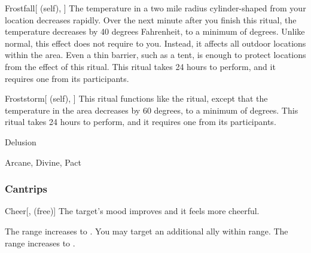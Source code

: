 \lowercase{\hypertarget{spell:Frostfall}{}}\label{spell:Frostfall}
\begin{attuneability}[Rank 4]{\hypertarget{spell:Frostfall}{Frostfall}}[ (self), ]
\targetrule
The temperature in a two mile radius cylinder-shaped  from your location decreases rapidly.
Over the next minute after you finish this ritual, the temperature decreases by 40 degrees Fahrenheit, to a minimum of  degrees.
Unlike normal, this effect does not require  to you.
Instead, it affects all outdoor locations within the area.
Even a thin barrier, such as a tent, is enough to protect locations from the effect of this ritual.
This ritual takes 24 hours to perform, and it requires one  from its participants.
\end{attuneability}
\vspace{0.25em}



\lowercase{\hypertarget{spell:Froststorm}{}}\label{spell:Froststorm}
\begin{attuneability}[Rank 8]{\hypertarget{spell:Froststorm}{Froststorm}}[ (self), ]
\targetrule
This ritual functions like the  ritual, except that the temperature in the area decreases by 60 degrees, to a minimum of  degrees.
This ritual takes 24 hours to perform, and it requires one  from its participants.
\end{attuneability}
\vspace{0.25em}


\newpage
\begin{spellsection}{Delusion}

\begin{spellheader}
\end{spellheader}


 Arcane, Divine, Pact

\subsubsection{Cantrips}


\begin{freeability}{Cheer}[,  (free)]
The target's mood improves and it feels more cheerful.

\rankline
{} The range increases to \rngmed.
 You may target an additional ally within range.
 The range increases to \rnglong.
\end{freeability}

\end{spellsection}


